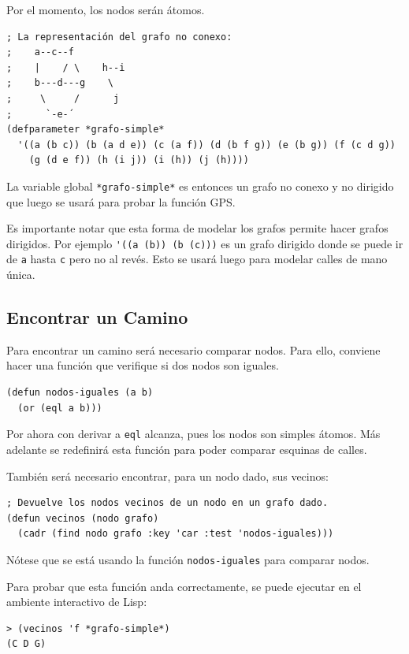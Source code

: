 \documentclass[12pt,titlepage]{article}
\begin{document}
Por el momento, los nodos serán átomos. 
\begin{lstlisting}
; La representación del grafo no conexo:
;    a--c--f     
;    |    / \    h--i
;    b---d---g    \
;     \     /      j
;      `-e-´
(defparameter *grafo-simple* 
  '((a (b c)) (b (a d e)) (c (a f)) (d (b f g)) (e (b g)) (f (c d g)) 
    (g (d e f)) (h (i j)) (i (h)) (j (h))))
\end{lstlisting}

La variable global \lstinline|*grafo-simple*| es entonces un grafo no conexo y no dirigido que luego se usará para probar la función GPS.

Es importante notar que esta forma de modelar los grafos permite hacer grafos dirigidos. Por ejemplo \lstinline|'((a (b)) (b (c)))| es un grafo dirigido donde se puede ir de \lstinline|a| hasta \lstinline|c| pero no al revés. Esto se usará luego para modelar calles de mano única.

\subsection{Encontrar un Camino}

Para encontrar un camino será necesario comparar nodos. Para ello, conviene hacer una función que verifique si dos nodos son iguales.
\begin{lstlisting}
(defun nodos-iguales (a b)
  (or (eql a b)))
\end{lstlisting}
Por ahora con derivar a \lstinline|eql| alcanza, pues los nodos son simples átomos. Más adelante se redefinirá esta función para poder comparar esquinas de calles.

También será necesario encontrar, para un nodo dado, sus vecinos:
\begin{lstlisting}
; Devuelve los nodos vecinos de un nodo en un grafo dado.
(defun vecinos (nodo grafo)
  (cadr (find nodo grafo :key 'car :test 'nodos-iguales)))
\end{lstlisting}
Nótese que se está usando la función \lstinline|nodos-iguales| para comparar nodos.

Para probar que esta función anda correctamente, se puede ejecutar en el ambiente interactivo de Lisp:
\begin{lstlisting}
> (vecinos 'f *grafo-simple*)
(C D G)
\end{lstlisting}
\end{document}
